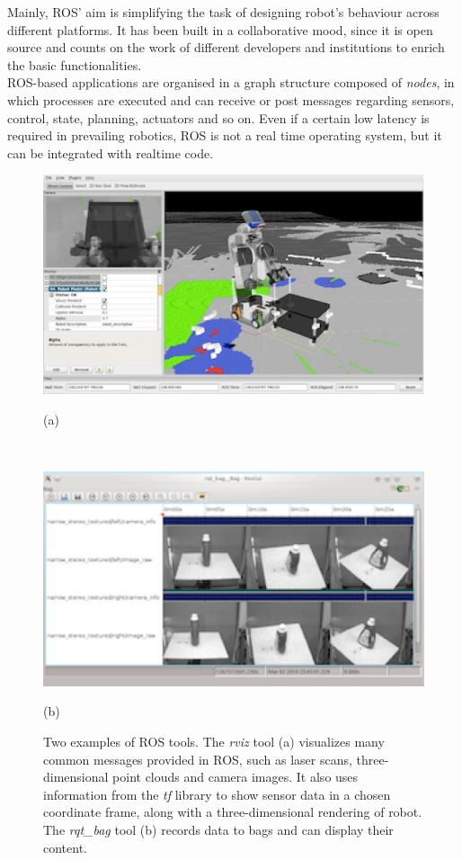 \documentclass[a4paper, onecolumn]{report}
\begin{document}
Mainly, ROS' aim is simplifying the task of designing robot's behaviour across different platforms. It has been built in a collaborative mood, since it is open source and counts on the work of different developers and institutions to enrich the basic functionalities.\\
ROS-based applications are organised in a graph structure composed of \emph{nodes}, in which processes are executed and can receive or post messages regarding sensors, control, state, planning, actuators and so on. Even if a certain low latency is required in prevailing robotics, ROS is not a real time operating system, but it can be integrated with realtime code. 
\begin{figure}[htb]
\centering
\begin{minipage}[c]{0.6\textwidth}
\centering\setlength{\captionmargin}{0pt}%
\centerline{\includegraphics[width=1.5\textwidth]{images/rviz.jpeg}}
(a)
\end{minipage} \\
\vspace{10mm}%
\begin{minipage}[c]{0.6\textwidth}
\centering\setlength{\captionmargin}{0pt}%
\centerline{\includegraphics[width=1.5\textwidth]{images/rqt_bag.jpeg}}
(b)
\end{minipage}
\caption{Two examples of ROS tools. The \emph{rviz} tool (a) visualizes many common messages provided in ROS, such as laser scans, three-dimensional point clouds and camera images. It also uses information from the \emph{tf} library to show sensor data in a chosen coordinate frame, along with a three-dimensional rendering of robot. The \emph{ rqt\_bag} tool (b) records data to bags and can display their content.}
\end{figure}
\end{document}
